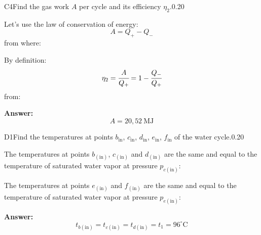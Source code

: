 \documentclass[11pt,a4paper]{article}
\begin{document}
\begin{solcard}{C4}{Find the gas work $A$ per cycle and its efficiency $\eta_2$.}{0.20}

Let's use the law of conservation of energy: $$
A=Q_+-Q_- $$ from where:


By definition: $$\eta_2=\cfrac{A}{Q_+}=1-\cfrac{Q_-}{Q_+} $$ from:

\par\smallskip\noindent\textbf{Answer:} $$
A=20{,}52~\text{MJ} $$
\end{solcard}

\begin{solcard}{D1}{Find the temperatures at points $b_\text{in}$, $c_\text{in}$, $d_\text{in}$, $e_\text{in}$, $f_\text{in}$ of the water cycle.}{0.20}

The temperatures at points $b_{(\text{in})}$, $c_{(\text{in})}$ and $d_{(\text{in})}$ are the same and equal to the temperature of saturated water vapor at pressure $p_{c(\text{in})}$:


The temperatures at points $e_{(\text{in})}$ and $f_{(\text{in})}$ are the same and equal to the temperature of saturated water vapor at pressure $p_{e(\text{in})}$:

\par\smallskip\noindent\textbf{Answer:} $$t_{b(\text{in})}=t_{c(\text{in})}=t_{d(\text{in})}=t_1=96^{\circ}\mathrm{C} $$
\end{solcard}
\end{document}
